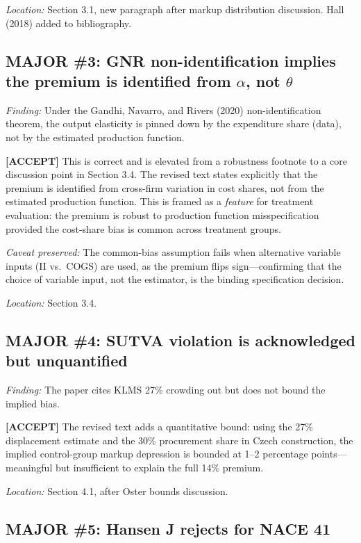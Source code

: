 \documentclass[11pt]{article}
\newcommand{\accept}{\textcolor{accept}{\textbf{[ACCEPT]}}}
\begin{document}
\textit{Location:} Section 3.1, new paragraph after markup distribution discussion. Hall (2018) added to bibliography.

\subsection*{MAJOR \#3: GNR non-identification implies the premium is identified from $\alpha$, not $\theta$}

\textit{Finding:} Under the Gandhi, Navarro, and Rivers (2020) non-identification theorem, the output elasticity is pinned down by the expenditure share (data), not by the estimated production function.

\accept{} This is correct and is elevated from a robustness footnote to a core discussion point in Section 3.4. The revised text states explicitly that the premium is identified from cross-firm variation in cost shares, not from the estimated production function. This is framed as a \emph{feature} for treatment evaluation: the premium is robust to production function misspecification provided the cost-share bias is common across treatment groups.

\textit{Caveat preserved:} The common-bias assumption fails when alternative variable inputs (II vs.\ COGS) are used, as the premium flips sign---confirming that the choice of variable input, not the estimator, is the binding specification decision.

\textit{Location:} Section 3.4.

\subsection*{MAJOR \#4: SUTVA violation is acknowledged but unquantified}

\textit{Finding:} The paper cites KLMS 27\% crowding out but does not bound the implied bias.

\accept{} The revised text adds a quantitative bound: using the 27\% displacement estimate and the 30\% procurement share in Czech construction, the implied control-group markup depression is bounded at 1--2 percentage points---meaningful but insufficient to explain the full 14\% premium.

\textit{Location:} Section 4.1, after Oster bounds discussion.

\subsection*{MAJOR \#5: Hansen J rejects for NACE 41}
\end{document}
